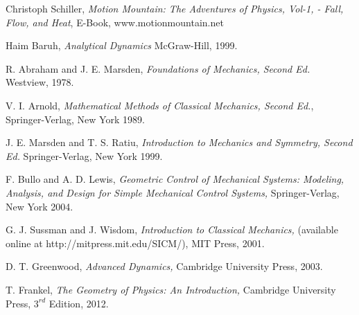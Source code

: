 \documentclass[graybox,envcountchap,sectrefs]{svmonoMuga}
\begin{document}
\begin{thebibliography}{lll}
 Christoph Schiller, \emph{Motion Mountain: The Adventures of Physics, Vol-1, - Fall, Flow, and Heat}, E-Book, www.motionmountain.net

 Haim Baruh,
\emph{Analytical Dynamics} McGraw-Hill, 1999.

 R. Abraham and J. E. Marsden,
\emph{Foundations of Mechanics, Second Ed.} Westview, 1978.

 V. I. Arnold,
\emph{Mathematical Methods of Classical Mechanics, Second Ed.},
 Springer-Verlag, New York 1989.

 J. E. Marsden and T. S. Ratiu,
\emph{Introduction to Mechanics and Symmetry, Second Ed.}
Springer-Verlag, New York 1999.

 F. Bullo and A. D. Lewis,
\emph{Geometric Control of Mechanical Systems: Modeling, Analysis, and Design for Simple Mechanical
Control Systems,} Springer-Verlag, New York 2004.

 G. J. Sussman and J. Wisdom,
\emph{Introduction to Classical Mechanics,} (available online at http://mitpress.mit.edu/SICM/), MIT Press, 2001.

 D. T. Greenwood,
\emph{Advanced Dynamics,}  Cambridge University Press, 2003.

 T. Frankel,
\emph{The Geometry of Physics: An Introduction,}  Cambridge University Press, $3^{rd}$ Edition, 2012.

\end{thebibliography}




\printindex
\end{document}
